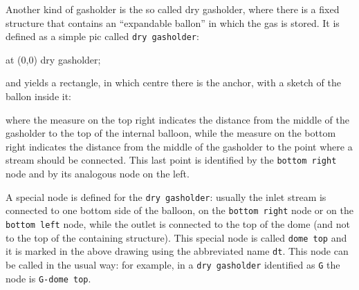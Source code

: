 \documentclass[12pt]{article}						%
\newcommand*{\chpn}[1]{\texttt{#1}}				%
\newcommand*{\chpp}[1]{\texttt{#1}}				%
\begin{document}
Another kind of gasholder is the so called dry gasholder, where there is a fixed
structure that contains an ``expandable ballon'' in which the gas is stored. It
is defined as a simple pic called \chpp{dry gasholder}:
\begin{chpcode}
	\pic at (0,0) {dry gasholder};
\end{chpcode}
and yields a rectangle, in which centre there is the anchor, with a sketch of the
ballon inside it:
\begin{center}
\end{center}
where the measure on the top right indicates the distance from the middle of the
gasholder to the top of the internal balloon, while the measure on the bottom
right indicates the distance from the middle of the gasholder to the point where
a stream should be connected. This last point is identified by the
\chpn{bottom right} node and by its analogous node on the left.

A special node is defined for the \chpp{dry gasholder}: usually the inlet stream
is connected to one bottom side of the balloon, on the \chpn{bottom right} node
or on the \chpn{bottom left} node, while the outlet is connected to the top of
the dome (and not to the top of the containing structure). This special node is
called \chpn{dome top} and it is marked in the above drawing using the
abbreviated name \chpn{dt}. This node can be called in the usual way: for
example, in a \chpn{dry gasholder} identified as \chpn{G} the node is
\chpn{G-dome top}.
\end{document}
